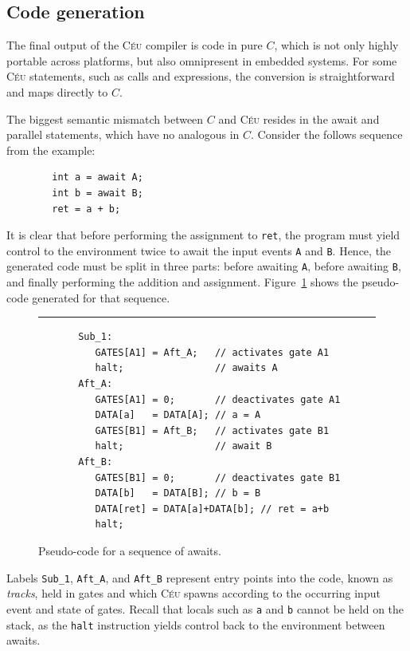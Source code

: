 \documentclass[11pt,a4paper]{article}
\newcommand{\2}{\;\;}
\newcommand{\5}{\;\;\;\;\;}
\newcommand{\CEU}{\textsc{C\'{e}u}}
\newcommand{\code}[1] {{\small{\texttt{#1}}}}
\begin{document}
\subsection{Code generation}
\label{sec:impl:code}

The final output of the \CEU{} compiler is code in pure $C$, which is not only 
highly portable across platforms, but also omnipresent in embedded systems.
For some \CEU{} statements, such as calls and expressions, the conversion is 
straightforward and maps directly to $C$.

The biggest semantic mismatch between $C$ and \CEU{} resides in the await and 
parallel statements, which have no analogous in $C$.
Consider the follows sequence from the example:
{\small
\begin{verbatim}
        int a = await A;
        int b = await B;
        ret = a + b;
\end{verbatim}
}
It is clear that before performing the assignment to \code{ret}, the program 
must yield control to the environment twice to await the input events \code{A} 
and \code{B}.
Hence, the generated code must be split in three parts: before awaiting 
\code{A}, before awaiting \code{B}, and finally performing the addition and 
assignment.
Figure~\ref{lst:impl:code:1} shows the pseudo-code generated for that sequence.
  
\begin{figure}[h]
\rule{15cm}{0.37pt}
{\small
\begin{verbatim}
       Sub_1:
          GATES[A1] = Aft_A;   // activates gate A1
          halt;                // awaits A
       Aft_A:
          GATES[A1] = 0;       // deactivates gate A1
          DATA[a]   = DATA[A]; // a = A
          GATES[B1] = Aft_B;   // activates gate B1
          halt;                // await B
       Aft_B:
          GATES[B1] = 0;       // deactivates gate B1
          DATA[b]   = DATA[B]; // b = B
          DATA[ret] = DATA[a]+DATA[b]; // ret = a+b
          halt;
\end{verbatim}
}
\caption{ Pseudo-code for a sequence of awaits.
\label{lst:impl:code:1}
}
\end{figure}

Labels \code{Sub\_1}, \code{Aft\_A}, and \code{Aft\_B} represent entry points 
into the code, known as \emph{tracks}, held in gates and which \CEU{} spawns 
according to the occurring input event and state of gates.
Recall that locals such as \code{a} and \code{b} cannot be held on the stack, 
as the \code{halt} instruction yields control back to the environment between 
awaits.  
\end{document}
